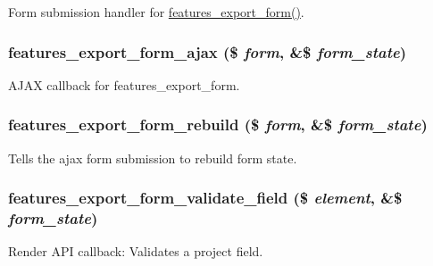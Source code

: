 Form submission handler for \hyperlink{group__forms_gac6d72d74ab676748b1197536446c1063}{features\_\-export\_\-form()}. \hypertarget{features_8admin_8inc_a0c79652184d03c394b6bccba1704d93d}{
\subsubsection[{features\_\-export\_\-form\_\-ajax}]{\setlength{\rightskip}{0pt plus 5cm}features\_\-export\_\-form\_\-ajax (\$ {\em form}, \/  \&\$ {\em form\_\-state})}}
\label{features_8admin_8inc_a0c79652184d03c394b6bccba1704d93d}
AJAX callback for features\_\-export\_\-form. \hypertarget{features_8admin_8inc_a9d25b511fe410f560211cfa78edb08c2}{
\subsubsection[{features\_\-export\_\-form\_\-rebuild}]{\setlength{\rightskip}{0pt plus 5cm}features\_\-export\_\-form\_\-rebuild (\$ {\em form}, \/  \&\$ {\em form\_\-state})}}
\label{features_8admin_8inc_a9d25b511fe410f560211cfa78edb08c2}
Tells the ajax form submission to rebuild form state. \hypertarget{features_8admin_8inc_a958b7918ee49cbc5e079c02bf89cbb18}{
\subsubsection[{features\_\-export\_\-form\_\-validate\_\-field}]{\setlength{\rightskip}{0pt plus 5cm}features\_\-export\_\-form\_\-validate\_\-field (\$ {\em element}, \/  \&\$ {\em form\_\-state})}}
\label{features_8admin_8inc_a958b7918ee49cbc5e079c02bf89cbb18}
Render API callback: Validates a project field.

